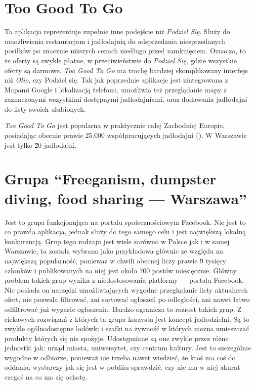 \documentclass[licencjacka]{pracamgr}
\begin{document}
\section{Too Good To Go}
Ta aplikacja reprezentuje zupełnie inne podejście niż \textit{Podziel Się}. Służy do umożliwienia restauracjom i jadłodajnią do odsprzedania niesprzedanych posiłków po znacznie niższych cenach niedługo przed zamknięciem. Oznacza, to że oferty są zwykle płatne, w przeciwieństwie do \textit{Podziel Się}, gdzie wszystkie oferty są darmowe. \textit{Too Good To Go} ma trochę bardziej skomplikowany interfejs niż \textit{Olio}, czy Podziel się. Tak jak poprzednie aplikacje jest zintegrowana z Mapami Google i lokalizacją telefonu, umożliwia też przeglądanie mapy z zaznaczonymi wszystkimi dostępnymi jadłodajniami, oraz dodawania jadłodajni do listy swoich ulubionych.

\textit{Too Good To Go} jest popularna w praktycznie całej Zachodniej Europie, posiadając obecnie prawie 25.000 współpracujących jadłodajni (\cite{tgtg}). W Warszawie jest tylko \~20 jadłodajni.

\section{Grupa ``Freeganism, dumpster diving, food sharing --- Warszawa''}
Jest to grupa funkcjonująca na portalu społecznościowym Facebook. Nie jest to co prawda aplikacja, jednak służy do tego samego celu i jest największą lokalną konkurencją. Grup tego rodzaju jest wiele zarówno w Polsce jak i w samej Warszawie, ta została wybrana jako przykładowa głównie ze względu na największą popularność, ponieważ w chwili obecnej liczy prawie 9 tysięcy członków i publikowanych na niej jest około 700 postów miesięcznie. Główny problem takich grup wynika z niedostosowania platformy --- portalu Facebook. Nie posiada on narzędzi umożliwiających wygodne przeglądanie listy aktualnych ofert, nie pozwala filtrować, ani sortować ogłoszeń po odległości, ani nawet łatwo odfiltrować już wygasłe ogłoszenia. Bardzo ogranicza to rozrost takich grup. Z ciekawych rozwiązań z których ta grupa korzysta jest koncept jadłodzielni. Są to zwykle ogólnodostępne lodówki i szafki na żywność w których można umieszczać produkty których się nie spożyje. Udostępniane są one zwykle przez różne jednostki jak: urząd miasta, uniwersytet, czy centrum kultury. Jest to szczególnie wygodne w odbiorze, ponieważ nie trzeba nawet wiedzieć, że ktoś ma coś do oddania, wystarczy jak się jest w pobliżu sprawdzić, czy nie ma w niej akurat czegoś na co ma się ochotę.
\end{document}
